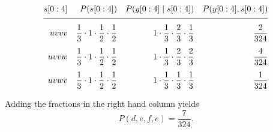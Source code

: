 \begin{subequations}
\label{eq:pcalc}
 \begin{align}
  \ts{s}{0}{4} & & P(\ts{s}{0}{4}) %
                & & P(\ts{y}{0}{4}\given \ts{s}{0}{4}) %
                 & & P(\ts{y}{0}{4},\ts{s}{0}{4})\nonumber\\[1ex]
  \hline\nonumber\\[-2ex]
  uvvv         & & \frac{1}{3} \cdot 1 \cdot \frac{1}{2} \cdot \frac{1}{2} %
                & & 1 \cdot \frac{1}{3} \cdot \frac{2}{3} \cdot \frac{1}{3} %
                 & & \frac{2}{324}\\[1ex]
  uvvw         & & \frac{1}{3} \cdot 1 \cdot \frac{1}{2} \cdot \frac{1}{2} %
                & & 1 \cdot \frac{1}{3} \cdot \frac{2}{3} \cdot \frac{2}{3} %
                 & & \frac{4}{324}\\[1ex]
  uvwv         & & \frac{1}{3} \cdot 1 \cdot \frac{1}{2} \cdot \frac{1}{2} %
                & & 1 \cdot \frac{1}{3} \cdot \frac{1}{3} \cdot \frac{1}{3} %
                 & & \frac{1}{324}
 \end{align}
\end{subequations}

Adding the fractions in the right hand column yields %
\begin{equation*}
  P(d,e,f,e) = \frac{7}{324}.
\end{equation*}

